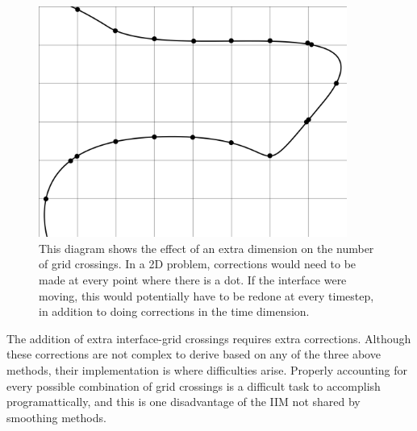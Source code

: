 \begin{figure}[h]
    \centering
    \includegraphics[width=0.9\textwidth]{diagrams/2DGrid}
    \caption{This diagram shows the effect of an extra dimension on the number of grid crossings.
    In a 2D problem, corrections would need to be made at every point where there is a dot.
    If the interface were moving, this would potentially have to be redone at every timestep, in addition to doing corrections in the time dimension.}
    \label{2DGrid}
\end{figure}

The addition of extra interface-grid crossings requires extra corrections.
Although these corrections are not complex to derive based on any of the three above methods, their implementation is where difficulties arise.
Properly accounting for every possible combination of grid crossings is a difficult task to accomplish programattically, and this is one disadvantage of the IIM not shared by smoothing methods.
